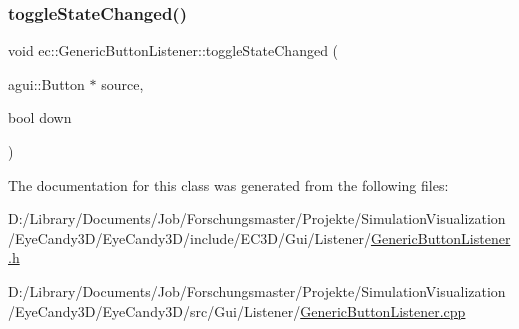 \subsubsection{\texorpdfstring{toggle\+State\+Changed()}{toggleStateChanged()}}
{\footnotesize\ttfamily void ec\+::\+Generic\+Button\+Listener\+::toggle\+State\+Changed (\begin{DoxyParamCaption}\item[{agui\+::\+Button $\ast$}]{source,  }\item[{bool}]{down }\end{DoxyParamCaption})\hspace{0.3cm}{\ttfamily [override]}}



The documentation for this class was generated from the following files\+:\begin{DoxyCompactItemize}
\item 
D\+:/\+Library/\+Documents/\+Job/\+Forschungsmaster/\+Projekte/\+Simulation\+Visualization/\+Eye\+Candy3\+D/\+Eye\+Candy3\+D/include/\+E\+C3\+D/\+Gui/\+Listener/\mbox{\hyperlink{_generic_button_listener_8h}{Generic\+Button\+Listener.\+h}}\item 
D\+:/\+Library/\+Documents/\+Job/\+Forschungsmaster/\+Projekte/\+Simulation\+Visualization/\+Eye\+Candy3\+D/\+Eye\+Candy3\+D/src/\+Gui/\+Listener/\mbox{\hyperlink{_generic_button_listener_8cpp}{Generic\+Button\+Listener.\+cpp}}\end{DoxyCompactItemize}
